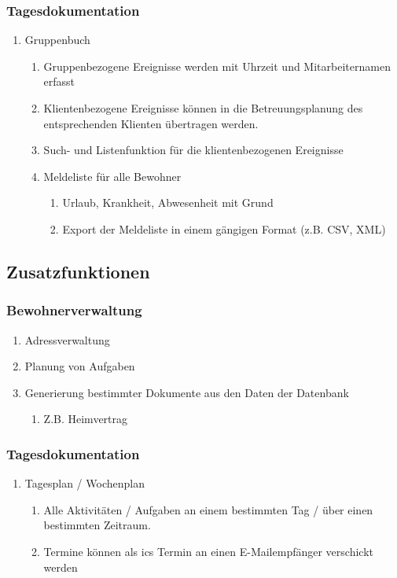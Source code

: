 \documentclass[a4paper,10pt]{article}
\begin{document}
\subsubsection{Tagesdokumentation}
\begin{enumerate}
	\item Gruppenbuch
	\begin{enumerate}
		\item Gruppenbezogene Ereignisse werden mit Uhrzeit und Mitarbeiternamen erfasst
		\item Klientenbezogene Ereignisse können in die Betreuungsplanung des entsprechenden Klienten übertragen werden.
		\item Such- und Listenfunktion für die klientenbezogenen Ereignisse
		\item Meldeliste für alle Bewohner
		\begin{enumerate}
			\item Urlaub, Krankheit, Abwesenheit mit Grund
			\item Export der Meldeliste in einem gängigen Format (z.B. CSV, XML)
		\end{enumerate}
	\end{enumerate}
\end{enumerate}


\subsection{Zusatzfunktionen}

\subsubsection{Bewohnerverwaltung}
\begin{enumerate}
	\item Adressverwaltung
	\item Planung von Aufgaben
	\item Generierung bestimmter Dokumente aus den Daten der Datenbank
	\begin{enumerate}
		\item Z.B. Heimvertrag
	\end{enumerate}
\end{enumerate}

\subsubsection{Tagesdokumentation}
\begin{enumerate}
	\item Tagesplan / Wochenplan
	\begin{enumerate}
		\item Alle Aktivitäten / Aufgaben an einem bestimmten Tag / über einen bestimmten Zeitraum.
		\item Termine können als ics Termin an einen E-Mailempfänger verschickt werden
	\end{enumerate}
\end{enumerate}
\end{document}
